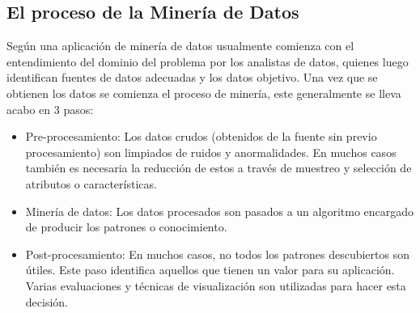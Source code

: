 


\subsection{El proceso de la Minería de Datos}
Según \cite{webmining} una aplicación de minería de datos usualmente comienza con el entendimiento del dominio del problema por los analistas de datos, quienes luego identifican fuentes de datos adecuadas y los datos objetivo. Una vez que se obtienen los datos se comienza el proceso de minería, este generalmente se lleva acabo en 3 pasos: 
\begin{itemize}
\item Pre-procesamiento: Los datos crudos (obtenidos de la fuente sin previo procesamiento) son limpiados de ruidos y anormalidades. En muchos casos también es necesaria la reducción de estos a través de muestreo y selección de atributos o características.
\item Minería de datos: Los datos procesados son pasados a un algoritmo encargado de producir los patrones o conocimiento.
\item Post-procesamiento: En muchos casos, no todos los patrones descubiertos son útiles. Este paso identifica aquellos que tienen un valor para su aplicación. Varias evaluaciones y técnicas de visualización son utilizadas para hacer esta decisión. 
\end{itemize}

